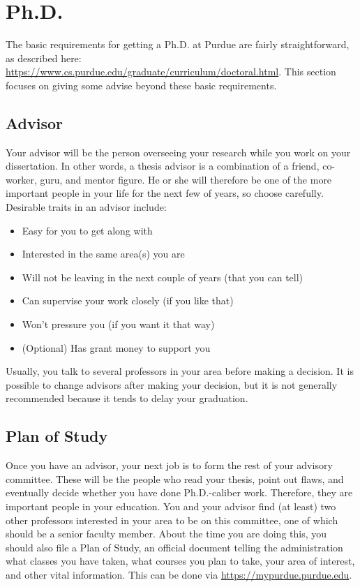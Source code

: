 \section{Ph.D.}

The basic requirements for getting a Ph.D. at Purdue are fairly straightforward, as described here: \url{https://www.cs.purdue.edu/graduate/curriculum/doctoral.html}. This section focuses on giving some advise beyond these basic requirements.

\subsection{Advisor}
Your advisor will be the person overseeing your research while you work on your dissertation. In other words, a thesis advisor is a combination of a friend, co-worker, guru, and mentor figure. He or she will therefore be one of the more important people in your life for the next few of years, so choose carefully. Desirable traits in an advisor include:

\begin{itemize}
	\item Easy for you to get along with
	\item Interested in the same area(s) you are
	\item Will not be leaving in the next couple of years (that you can tell)
	\item Can supervise your work closely (if you like that)
	\item Won't pressure you (if you want it that way)
	\item (Optional) Has grant money to support you
\end{itemize}

Usually, you talk to several professors in your area before making a decision. It is possible to change advisors after making your decision, but it is not generally recommended because it tends to delay your graduation.

\subsection{Plan of Study}
Once you have an advisor, your next job is to form the rest of your advisory committee. These will be the people who read your thesis, point out flaws, and eventually decide whether you have done Ph.D.-caliber work. Therefore, they are important people in your education. You and your advisor find (at least) two other professors interested in your area to be on this committee, one of which should be a senior faculty member. About the time you are doing this, you should also file a Plan of Study, an official document telling the administration what classes you have taken, what courses you plan to take, your area of interest, and other vital information. This can be done via \url{https://mypurdue.purdue.edu}.

